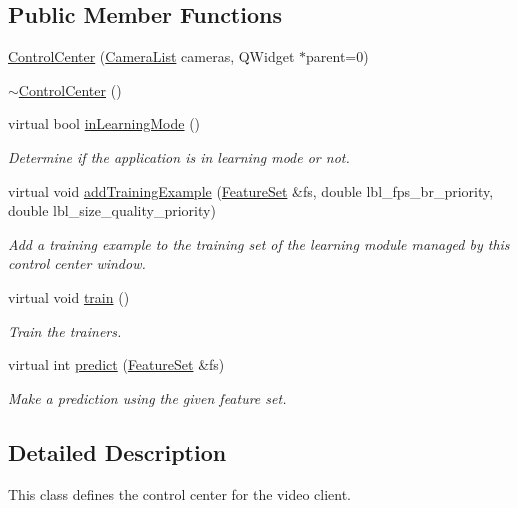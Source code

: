 \subsection*{Public Member Functions}
\begin{DoxyCompactItemize}
\item 
\hyperlink{classControlCenter_aba3b5aafd3a4ee5c611d134b5d28d353}{Control\-Center} (\hyperlink{camera_8h_a4e5cc6bdc5723a4d61f3aac69dbb083a}{Camera\-List} cameras, Q\-Widget $\ast$parent=0)
\item 
\hyperlink{classControlCenter_a9ac145ced26cf2002a9d12c4c20bdc75}{$\sim$\-Control\-Center} ()
\item 
virtual bool \hyperlink{classControlCenter_ae266db4d72a14ca7e44918b1ed23e90d}{in\-Learning\-Mode} ()
\begin{DoxyCompactList}\small\item\em Determine if the application is in learning mode or not. \end{DoxyCompactList}\item 
virtual void \hyperlink{classControlCenter_afac0b42e4af9070671cd58f3bc2374d1}{add\-Training\-Example} (\hyperlink{classFeatureSet}{Feature\-Set} \&fs, double lbl\-\_\-fps\-\_\-br\-\_\-priority, double lbl\-\_\-size\-\_\-quality\-\_\-priority)
\begin{DoxyCompactList}\small\item\em Add a training example to the training set of the learning module managed by this control center window. \end{DoxyCompactList}\item 
virtual void \hyperlink{classControlCenter_a27c7a5e1ebd583354f2ceb0b1180e9ad}{train} ()
\begin{DoxyCompactList}\small\item\em Train the trainers. \end{DoxyCompactList}\item 
virtual int \hyperlink{classControlCenter_a3ef143b96207ec1165357cd98cd927e8}{predict} (\hyperlink{classFeatureSet}{Feature\-Set} \&fs)
\begin{DoxyCompactList}\small\item\em Make a prediction using the given feature set. \end{DoxyCompactList}\end{DoxyCompactItemize}


\subsection{Detailed Description}
This class defines the control center for the video client. 


